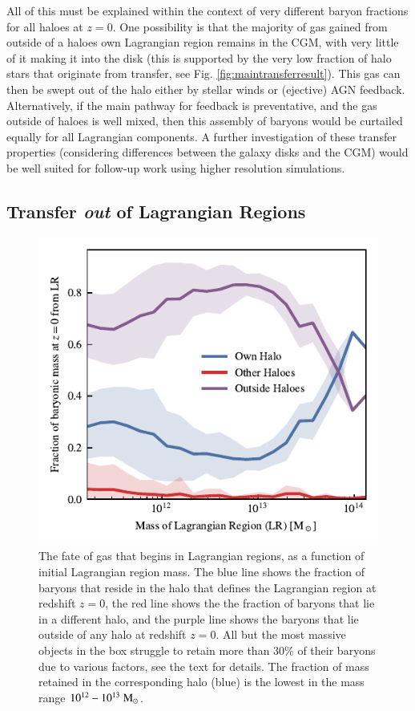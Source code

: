 \documentclass[fleqn,usenatbib]{mnras}
\newcommand{\msolar}{\;{\rm M}_{\odot}}
\begin{document}
All of this must be explained within the context of very different baryon
fractions for all haloes at $z=0$. One possibility is that the majority of
gas gained from outside of a haloes own Lagrangian region remains in the CGM,
with very little of it making it into the disk (this is supported by the very
low fraction of halo stars that originate from transfer, see Fig.
\ref{fig:maintransferresult}). This gas can then be swept out of the halo
either by stellar winds or (ejective) AGN feedback. Alternatively, if the
main pathway for feedback is preventative, and the gas outside of haloes is
well mixed, then this assembly of baryons would be curtailed equally for all
Lagrangian components. A further investigation of these transfer properties
(considering differences between the galaxy disks and the CGM) would be well
suited for follow-up work using higher resolution simulations.

\subsection{Transfer \emph{out} of Lagrangian Regions}

\begin{figure}
	\centering
	\includegraphics{figures/s50j7kAHF/inverse_component_fraction.pdf}
	\vspace{-0.7cm}
 \caption{The fate of gas that begins in Lagrangian regions, as a function of
 initial Lagrangian region mass. The blue line shows the fraction of baryons
 that reside in the halo that defines the Lagrangian region at redshift
 $z=0$, the red line shows the the fraction of baryons that lie in a
 different halo, and the purple line shows the baryons that lie outside of
 any halo at redshift $z=0$. All but the most massive objects in the box
 struggle to retain more than 30\% of their baryons due to various factors,
 see the text for details. The fraction of mass retained in the corresponding
 halo (blue) is the lowest in the mass range $10^{12} - 10^{13}\msolar{}$.}

	\label{fig:transferoutoflrs}
\end{figure}
\end{document}
